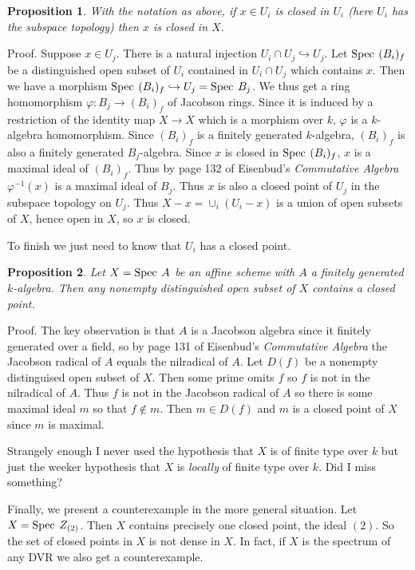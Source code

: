 \documentclass[12pt]{article}
\newtheorem{prop}{Proposition}
\renewcommand{\phi}{\varphi}
\newcommand{\spec}{\mbox{\rm Spec \hspace{.01in}}}
\newcommand{\proof}{\mbox{\sc Proof.\hspace{.1in}}}
\begin{document}
\begin{prop} 
With the notation as above, if $x\in U_i$ is closed in $U_i$ (here
$U_i$ has the subspace topology) then $x$ is closed in $X$. 
\end{prop}
\proof
Suppose $x\in U_j$. There is a natural injection 
$U_i\cap U_j\hookrightarrow U_j$. Let $\spec (B_i)_f$ be
a distinguished open subset of $U_i$ contained in $U_i\cap U_j$
which contains $x$. Then we have a morphism 
$\spec(B_i)_f\hookrightarrow U_j=\spec B_j$. We
thus get a ring homomorphism $\phi:B_j\rightarrow (B_i)_f$
of Jacobson rings. Since it is induced by a restriction of 
the identity map $X\rightarrow X$ which is a morphism over
$k$, $\phi$ is a $k$-algebra homomorphism. 
Since $(B_i)_f$ is a finitely generated $k$-algebra, $(B_i)_f$ is
also a finitely generated $B_j$-algebra. Since $x$ is closed
in $\spec(B_i)_f$, $x$ is a maximal ideal of $(B_i)_f$. 
Thus by page 132 of Eisenbud's {\em Commutative Algebra}
$\phi^{-1}(x)$ is a maximal ideal of $B_j$. Thus $x$ is also
a closed point of $U_j$ in the subspace topology on $U_j$. 
Thus $X-x=\cup_{i}(U_i-x)$ is a union of open subsets of $X$, 
hence open in $X$, so $x$ is closed. 

To finish we just need to know that $U_i$ has a closed point. 
  
\begin{prop}
Let $X=\spec A$ be an affine scheme with $A$ a finitely generated
$k$-algebra. Then any nonempty distinguished open subset of $X$ 
contains a closed point.
\end{prop}
\proof
The key observation is that $A$ is a Jacobson algebra since it finitely
generated over a field, so by page 131 of Eisenbud's {\em Commutative
Algebra} the Jacobson radical of $A$ equals
the nilradical of $A$. Let $D(f)$ be a nonempty
distinguised open subset of $X$. Then some prime omits $f$
so $f$ is not in the nilradical of $A$. Thus $f$ is not
in the Jacobson radical of $A$ so there is some maximal
ideal $m$ so that $f\notin m$. Then $m \in D(f)$ and 
$m$ is a closed point of $X$ since $m$ is maximal.

Strangely enough I never used the hypothesis that $X$ is of
finite type over $k$ but just the weeker hypothesis that
$X$ is {\em locally} of finite type over $k$. Did I miss something? 

Finally, we present a counterexample in the more general situation. Let
$X=\spec Z_{(2)}$. Then $X$ contains precisely one closed
point, the ideal $(2)$. So the set of closed points in $X$ is
not dense in $X$. In fact, if $X$ is the spectrum of any
DVR we also get a counterexample.   
\end{document}
